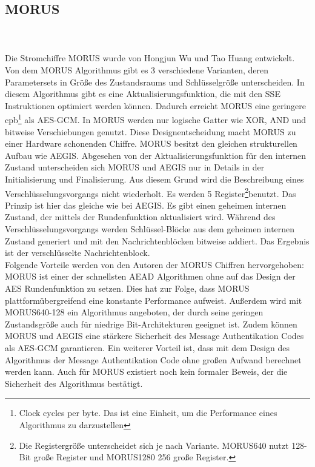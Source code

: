 \subsection{MORUS}
\\
\\
Die Stromchiffre MORUS wurde von Hongjun Wu und Tao Huang entwickelt. Von dem MORUS Algorithmus gibt es 3 verschiedene Varianten, deren Parametersets in Größe des Zustandsraums und Schlüsselgröße unterscheiden. In diesem Algorithmus gibt es eine Aktualisierungsfunktion, die mit den \gls{SSE} Instruktionen optimiert werden können. Dadurch erreicht MORUS eine geringere cpb\footnote[11]{Clock cycles per byte. Das ist eine Einheit,  um die Performance eines Algorithmus zu darzustellen} als \gls{AES-GCM}. In MORUS werden nur logische Gatter wie XOR, AND und bitweise Verschiebungen genutzt. Diese Designentscheidung macht MORUS zu einer Hardware schonenden Chiffre. MORUS besitzt den gleichen strukturellen Aufbau wie AEGIS. Abgesehen von der Aktualisierungsfunktion für den internen Zustand unterscheiden sich MORUS und AEGIS nur in Details in der Initialisierung und Finalisierung. Aus diesem Grund wird die Beschreibung eines Verschlüsselungsvorgangs nicht wiederholt. Es werden 5 Register\footnote[12]{Die Registergröße unterscheidet sich je nach Variante. MORUS640 nutzt 128-Bit große Register und MORUS1280 256 große Register.}benutzt. Das Prinzip ist hier das gleiche wie bei AEGIS. Es gibt einen geheimen internen Zustand, der mittels der Rundenfunktion aktualisiert wird. Während des Verschlüsselungsvorgangs werden \glqq Schlüssel\grqq{}-Blöcke aus dem geheimen internen Zustand generiert und mit den Nachrichtenblöcken bitweise addiert. Das Ergebnis ist der verschlüsselte Nachrichtenblock.  \\
Folgende Vorteile werden von den Autoren der MORUS Chiffren hervorgehoben: MORUS ist einer der schnellsten \gls{AEAD} Algorithmen ohne auf das Design der \gls{AES} Rundenfunktion zu setzen. Dies hat zur Folge, dass MORUS plattformübergreifend eine konstante Performance aufweist. Außerdem wird mit MORUS640-128 ein Algorithmus angeboten, der durch seine geringen Zustandsgröße auch für niedrige Bit-Architekturen geeignet ist. Zudem können MORUS und AEGIS eine stärkere Sicherheit des Message Authentikation Codes als \gls{AES-GCM} garantieren. Ein weiterer Vorteil ist, dass mit dem Design des Algorithmus der Message Authentikation Code ohne großen Aufwand berechnet werden kann.
Auch für MORUS existiert noch kein formaler Beweis, der die Sicherheit des Algorithmus bestätigt\cite{wuauthenticated}\cite{mosnavcekoptimizing}.
